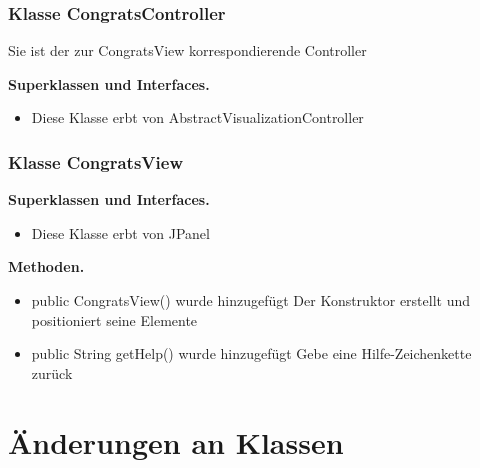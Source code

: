 \documentclass{article}
\begin{document}
	\subsubsection{Klasse CongratsController}
    Sie ist der zur CongratsView korrespondierende Controller\newline
    
	    \textbf{Superklassen und Interfaces.}\newline
        \begin{itemize}
            \item Diese Klasse erbt von AbstractVisualizationController \newline
           \end{itemize}

	\subsubsection{Klasse CongratsView}

	    \textbf{Superklassen und Interfaces.}\newline
        \begin{itemize}
            \item Diese Klasse erbt von JPanel \newline
           \end{itemize}

    \textbf{Methoden.}\newline
	   \begin{itemize}
           \item public CongratsView() wurde hinzugefügt\newline
               Der Konstruktor erstellt und positioniert seine Elemente\newline
           \item public String getHelp() wurde hinzugefügt\newline
               Gebe eine Hilfe-Zeichenkette zurück\newline
           \end{itemize}


\section{Änderungen an Klassen}
\end{document}
